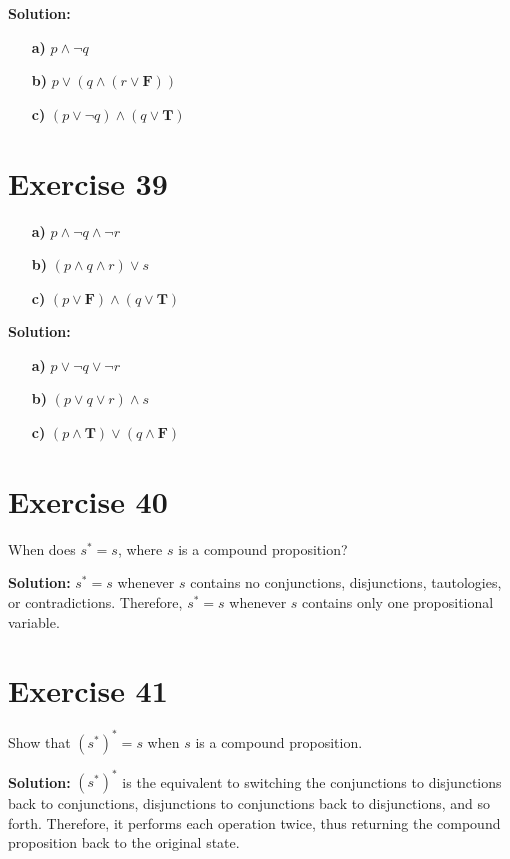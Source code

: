\documentclass{Axon}
\begin{document}
\noindent
\textbf{Solution:}
\begin{enumerate}
    \item[\textbf{a)}] \(p \land \lnot q\)
    \item[\textbf{b)}] \(p \lor (q \land (r \lor \textbf{F}))\)
    \item[\textbf{c)}] \((p \lor \lnot q) \land (q \lor \textbf{T})\)
\end{enumerate}

\section*{Exercise 39}
\begin{enumerate}
    \item[\textbf{a)}] \(p \land \lnot q \land \lnot r\)
    \item[\textbf{b)}] \((p \land q \land r) \lor s\)
    \item[\textbf{c)}] \((p \lor \textbf{F}) \land (q \lor \textbf{T})\)
\end{enumerate}

\noindent
\textbf{Solution:}
\begin{enumerate}
    \item[\textbf{a)}] \(p \lor \lnot q \lor \lnot r\)
    \item[\textbf{b)}] \((p \lor q \lor r) \land s\)
    \item[\textbf{c)}] \((p \land \textbf{T}) \lor (q \land \textbf{F})\)
\end{enumerate}

\section*{Exercise 40}
When does \(s^* = s\), where \(s\) is a compound proposition?

\noindent
\textbf{Solution:}
\(s^* = s\) whenever \(s\) contains no conjunctions, disjunctions, tautologies, or contradictions. Therefore, \(s^* = s\) whenever \(s\) contains only one propositional variable.

\section*{Exercise 41}
Show that \((s^*)^* = s\) when \(s\) is a compound proposition.

\noindent
\textbf{Solution:}
\((s^*)^*\) is the equivalent to switching the conjunctions to disjunctions back to conjunctions, disjunctions to conjunctions back to disjunctions, and so forth. Therefore, it performs each operation twice, thus returning the compound proposition back to the original state.
\end{document}
